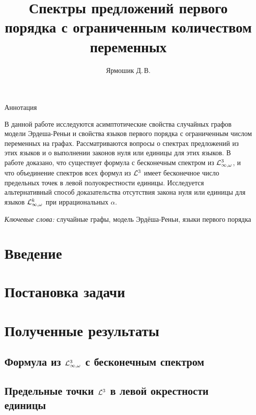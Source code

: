 \documentclass{mipt-thesis-bs}
\title{Спектры предложений первого порядка с ограниченным количеством переменных}
\author{Ярмошик Д.\,В.}
\begin{document}
    \titlepage \clearpage %
    \pagestyle{miptthesis}
\begin{center}
    {\Large Аннотация}
\end{center}

В данной работе исследуются асимптотические свойства случайных графов модели Эрдеша-Реньи и свойства языков первого порядка с ограниченным числом переменных на графах. Рассматриваются вопросы о спектрах предложений из этих языков и о выполнении законов нуля или единицы для этих языков. В работе доказано, что существует формула с бесконечным спектром из $\mathcal{L}^3_{\infty, \omega}$, и что объединение спектров всех формул из $\mathcal{L}^3$ имеет бесконечное число предельных точек в левой полуокрестности единицы. Исследуется альтернативный способ доказательства отсутствия закона нуля или единицы для языков $\mathcal{L}^k_{\infty, \omega}$ при иррациональных $\alpha$.

\textit{Ключевые слова:} случайные графы, модель Эрдёша-Реньи, языки первого порядка
\clearpage

    \tableofcontents \clearpage %





\section{Введение}

\newpage

\section{Постановка задачи}

\newpage

\section{Полученные результаты}
\subsection{Формула из \texorpdfstring{$\mathcal{L}^3_{\infty, \omega}$}{L 3 infty,omega} с бесконечным спектром}

\newpage

\subsection{Предельные точки \texorpdfstring{$\mathcal{L}^3$}{L 3} в левой окрестности единицы}
\label{sec:triangles}

\newpage
\end{document}
